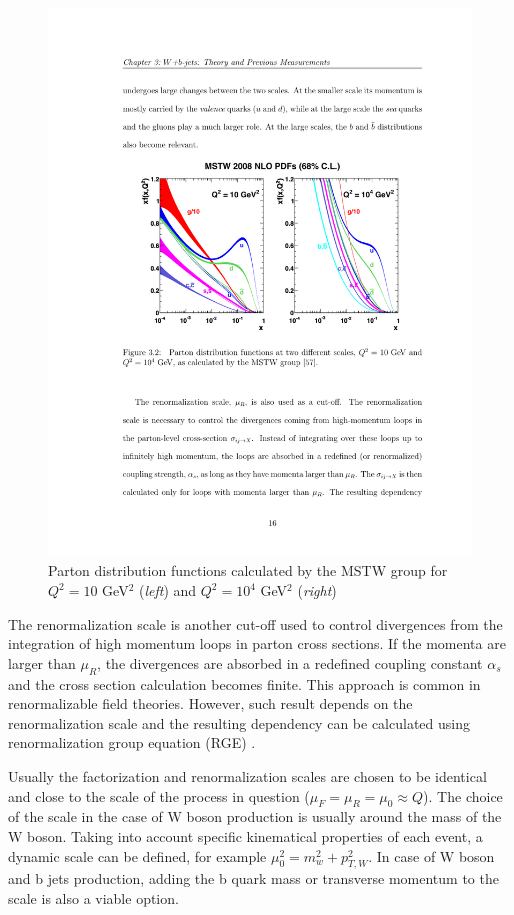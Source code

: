 \begin{figure}[htbp]
	\centering
		\includegraphics{Figures/MSTW.pdf}
	\caption[Parton distribution functions for different momentum transfers]{Parton distribution functions calculated by the MSTW group for $Q^2=10$ GeV$^2$ (\textit{left}) and $Q^2=10^4$ GeV$^2$ (\textit{right}) \citep{Martin:2009iq}}
	\label{fig:MSTW}
\end{figure}	
The renormalization scale is another cut-off used to control divergences from the integration of high momentum loops in parton cross sections. If the momenta are larger than $\mu_R$, the divergences are absorbed in a redefined coupling constant $\alpha_s$ and the cross section calculation becomes finite. This approach is common in renormalizable field theories. However, such result depends on the renormalization scale and the resulting dependency can be calculated using renormalization group equation (RGE) \cite{opac-b1131978}.
\par Usually the factorization and renormalization scales are chosen to be identical and close to the scale of the process in question ($\mu_F=\mu_R=\mu_0\approx Q$). The choice of the scale in the case of W boson production is usually around the mass of the W boson. Taking into account specific kinematical properties of each event, a dynamic scale can be defined, for example $\mu^2_0=m_w^2+p_{T,W}^2$. In case of W boson and b jets production, adding the b quark mass or transverse momentum to the scale is also a viable option. 

